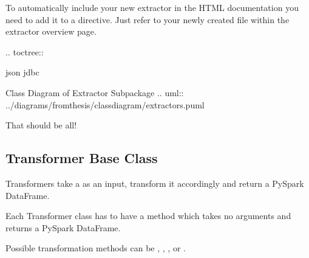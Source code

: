 \documentclass[a4paper,10pt, twoside,english]{sphinxmanual}
\begin{document}
To automatically include your new extractor in the HTML documentation you need to add it to a  directive. Just refer to your newly created
 file within the extractor overview page.
\def\sphinxLiteralBlockLabel{\label{\detokenize{base_classes/extractor:id5}}}
\begin{sphinxVerbatim}[commandchars=\\\{\}]
 .. toctree::
 
     json
     jdbc
 
 Class Diagram of Extractor Subpackage
 \PYGZhy{}\PYGZhy{}\PYGZhy{}\PYGZhy{}\PYGZhy{}\PYGZhy{}\PYGZhy{}\PYGZhy{}\PYGZhy{}\PYGZhy{}\PYGZhy{}\PYGZhy{}\PYGZhy{}\PYGZhy{}\PYGZhy{}\PYGZhy{}\PYGZhy{}\PYGZhy{}\PYGZhy{}\PYGZhy{}\PYGZhy{}\PYGZhy{}\PYGZhy{}\PYGZhy{}\PYGZhy{}\PYGZhy{}\PYGZhy{}\PYGZhy{}\PYGZhy{}\PYGZhy{}\PYGZhy{}\PYGZhy{}\PYGZhy{}\PYGZhy{}\PYGZhy{}\PYGZhy{}\PYGZhy{}\PYGZhy{}\PYGZhy{}\PYGZhy{}\PYGZhy{}\PYGZhy{}\PYGZhy{}\PYGZhy{}\PYGZhy{}\PYGZhy{}\PYGZhy{}\PYGZhy{}
 .. uml:: ../diagrams/from\PYGZus{}thesis/class\PYGZus{}diagram/extractors.puml
\end{sphinxVerbatim}

That should be all!


\subsection{Transformer Base Class}
\label{\detokenize{base_classes/transformer:module-spooq2.transformer.transformer}}\label{\detokenize{base_classes/transformer:transformer-base-class}}\label{\detokenize{base_classes/transformer::doc}}
Transformers take a  as an input, transform it accordingly
and return a PySpark DataFrame.

Each Transformer class has to have a  method which takes no arguments
and returns a PySpark DataFrame.

Possible transformation methods can be ,
, ,  or
.
\end{document}
